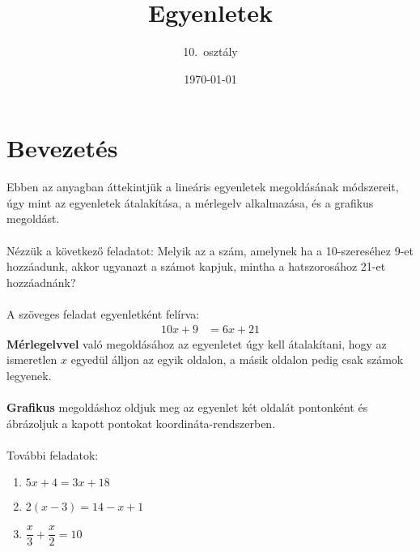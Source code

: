 \documentclass[12pt,a4paper]{article}
\title{Egyenletek}
\author{10.\ osztály}
\date{\today}
\begin{document}
\maketitle

\section*{Bevezetés}
\noindent Ebben az anyagban áttekintjük a lineáris egyenletek megoldásának módszereit, 
úgy mint az egyenletek átalakítása, a mérlegelv alkalmazása, és a grafikus megoldást.
 \\\\
\noindent Nézzük a következő feladatot: Melyik az a szám, amelynek ha a 10-szereséhez 9-et hozzáadunk, 
akkor ugyanazt a számot kapjuk, mintha a hatszorosához 21-et hozzáadnánk?
\\\\
\noindent A szöveges feladat egyenletként felírva:
\begin{align*}
    10x + 9 &= 6x +21
\end{align*}
\noindent \textbf{Mérlegelvvel} való megoldásához az egyenletet úgy kell átalakítani, hogy az ismeretlen $x$ egyedül álljon az egyik oldalon,
a másik oldalon pedig csak számok legyenek. 
\\\\
\noindent \textbf{Grafikus} megoldáshoz oldjuk meg az egyenlet két oldalát pontonként és ábrázoljuk a kapott pontokat koordináta-rendszerben.
\\\\
\noindent További feladatok:
\noindent
\begin{enumerate}[label=\alph*]
  \item \quad $5x + 4 = 3x + 18$
  \item \quad $2(x-3) = 14 - x+1$
  \item \quad $\dfrac{x}{3} + \dfrac{x}{2} = 10$
\end{enumerate}
\end{document}
